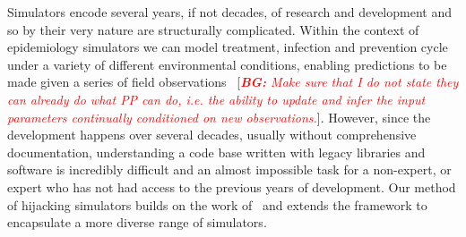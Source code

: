 \documentclass{article}
\newcommand{\bg}[1]{~{{[{\it \textcolor{red}{{\bf BG:} #1}}]}}}
\begin{document}
Simulators encode several years, if not decades, of research and development and so by their very nature are structurally complicated. 
Within the context of epidemiology simulators we can model treatment, infection and prevention cycle under a variety of different environmental conditions, enabling predictions to be made given a series of field observations \bg{Make sure that I do not state they can already do what PP can do, i.e. the ability to update and infer the input parameters continually conditioned on new observations.}. 
However, since the development happens over several decades, usually without comprehensive documentation, understanding a code base written with legacy libraries and software is incredibly difficult and an almost impossible task for a non-expert, or expert who has not had access to the previous years of development. 
Our method of hijacking simulators builds on the work of~\cite{baydin2018efficient} and extends the framework to encapsulate a more diverse range of simulators. 
\end{document}
